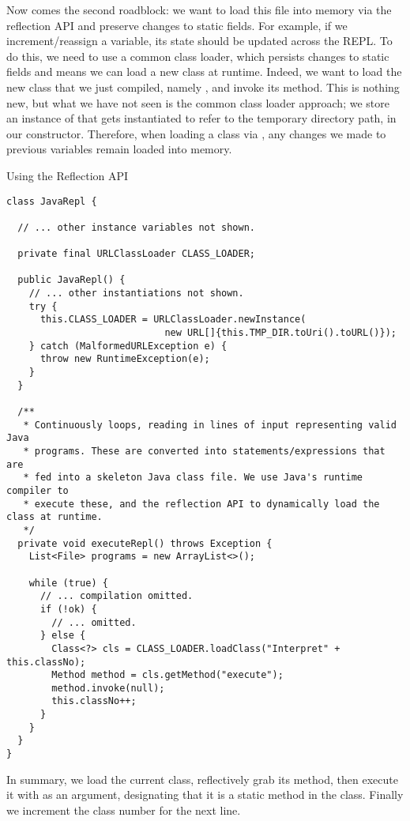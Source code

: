 Now comes the second roadblock: we want to load this file into memory via the reflection API and preserve changes to static fields. For example, if we increment/reassign a variable, its state should be updated across the REPL. To do this, we need to use a common class loader, which persists changes to static fields and means we can load a new class at runtime. Indeed, we want to load the new class that we just compiled, namely , and invoke its  method. This is nothing new, but what we have not seen is the common class loader approach; we store an instance of  that gets instantiated to refer to the temporary directory path, in our constructor. Therefore, when loading a class via , any changes we made to previous variables remain loaded into memory.

\begin{cl}[]{Using the Reflection API}
\begin{lstlisting}[language=MyJava]
class JavaRepl {

  // ... other instance variables not shown.

  private final URLClassLoader CLASS_LOADER;

  public JavaRepl() {
    // ... other instantiations not shown.
    try {
      this.CLASS_LOADER = URLClassLoader.newInstance(
                            new URL[]{this.TMP_DIR.toUri().toURL()});
    } catch (MalformedURLException e) {
      throw new RuntimeException(e);
    }
  }

  /**
   * Continuously loops, reading in lines of input representing valid Java
   * programs. These are converted into statements/expressions that are
   * fed into a skeleton Java class file. We use Java's runtime compiler to
   * execute these, and the reflection API to dynamically load the class at runtime.
   */
  private void executeRepl() throws Exception {
    List<File> programs = new ArrayList<>();

    while (true) {
      // ... compilation omitted.
      if (!ok) {
        // ... omitted.
      } else {
        Class<?> cls = CLASS_LOADER.loadClass("Interpret" + this.classNo);
        Method method = cls.getMethod("execute");
        method.invoke(null);
        this.classNo++;
      }
    }
  }
}
\end{lstlisting}
\end{cl}

In summary, we load the current class, reflectively grab its  method, then execute it with  as an argument, designating that it is a static method in the class. Finally we increment the class number for the next line.